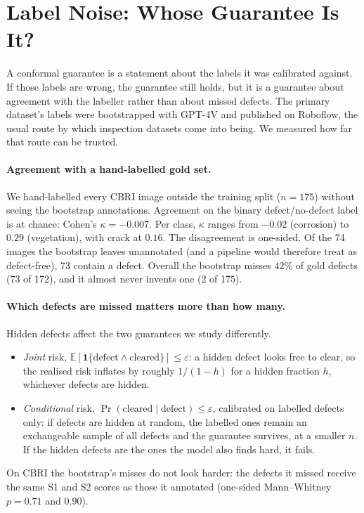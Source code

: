 
\section{Label Noise: Whose Guarantee Is It?}
\label{sec:label-noise}

A conformal guarantee is a statement about the labels it was calibrated
against. If those labels are wrong, the guarantee still holds, but it is a
guarantee about agreement with the labeller rather than about missed
defects. The primary dataset's labels were bootstrapped with GPT-4V and
published on Roboflow, the usual route by which inspection datasets come
into being. We measured how far that route can be trusted.

\paragraph{Agreement with a hand-labelled gold set.}
We hand-labelled every CBRI image outside the training split ($n = 175$)
without seeing the bootstrap annotations. Agreement on the binary
defect/no-defect label is at chance: Cohen's $\kappa = -0.007$. Per class,
$\kappa$ ranges from $-0.02$ (corrosion) to $0.29$ (vegetation), with
crack at $0.16$. The disagreement is one-sided. Of the 74 images the
bootstrap leaves unannotated (and a pipeline would therefore treat as
defect-free), 73 contain a defect. Overall the bootstrap misses $42\%$ of
gold defects (73 of 172), and it almost never invents one (2 of 175).

\paragraph{Which defects are missed matters more than how many.}
Hidden defects affect the two guarantees we study differently.
\begin{itemize}
  \item \emph{Joint} risk, $\mathbb{E}[\mathbf{1}\{\text{defect} \wedge
  \text{cleared}\}] \le \varepsilon$: a hidden defect looks free to clear,
  so the realised risk inflates by roughly $1/(1-h)$ for a hidden fraction
  $h$, whichever defects are hidden.
  \item \emph{Conditional} risk, $\Pr(\text{cleared} \mid \text{defect})
  \le \varepsilon$, calibrated on labelled defects only: if defects are
  hidden at random, the labelled ones remain an exchangeable sample of all
  defects and the guarantee survives, at a smaller $n$. If the hidden
  defects are the ones the model also finds hard, it fails.
\end{itemize}
On CBRI the bootstrap's misses do not look harder: the defects it missed
receive the same S1 and S2 scores as those it annotated (one-sided
Mann--Whitney $p = 0.71$ and $0.90$).

